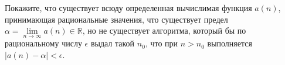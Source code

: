 Покажите, что существует всюду определенная вычислимая функция $a(n)$, принимающая рациональные значения, что существует
предел $\alpha = \lim\limits_{n \to \infty} a(n) \in \mathbb{R}$, но не существует алгоритма, который бы по рациональному
числу $\epsilon$ выдал такой $n_0$, что при $n > n_0$ выполняется $|a(n) - \alpha| < \epsilon$.